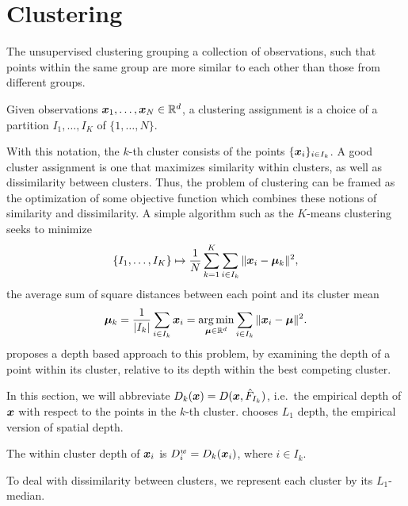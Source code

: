 \section{Clustering}
\label{sec:multivariate_clustering}

The unsupervised clustering grouping a collection of observations, such that
points within the same group are more similar to each other than those from
different groups.

\begin{definition}[Clustering]
    Given observations $\bm{x}_1, \dots, \bm{x}_N \in \mathbb{R}^d$, a clustering assignment
    is a choice of a partition $I_1, \dots, I_K$ of $\{1, \dots, N\}$.
\end{definition}

With this notation, the $k$-th cluster consists of the points $\{\bm{x}_i\}_{i
\in I_k}$.
A good cluster assignment is one that maximizes similarity within clusters, as
well as dissimilarity between clusters.
Thus, the problem of clustering can be framed as the optimization of some
objective function which combines these notions of similarity and
dissimilarity.
A simple algorithm such as the $K$-means clustering seeks to minimize
\begin{equation}
    \{I_1, \dots, I_K\} \mapsto \frac{1}{N} \sum_{k = 1}^K \sum_{i \in I_k} \Vert \bm{x}_i - \bm{\mu}_k \Vert^2,
\end{equation}
the average sum of square distances between each point and its cluster mean
\begin{equation}
    \bm{\mu}_k = \frac{1}{|I_k|} \sum_{i \in I_k} \bm{x}_i
    = \operatorname*{arg\,min}_{\bm{\mu} \in \mathbb{R}^d} \sum_{i \in I_k} \Vert \bm{x}_i - \bm{\mu} \Vert^2.
\end{equation}
\textcite{jornsten-2004} proposes a depth based approach to this problem, by
examining the depth of a point within its cluster, relative to its depth
within the best competing cluster.

In this section, we will abbreviate $D_k(\bm{x}) = D(\bm{x}, \hat{F}_{I_k})$, i.e.\
the empirical depth of $\bm{x}$ with respect to the points in the $k$-th cluster.
\textcite{jornsten-2004} chooses $L_1$ depth, the empirical version of spatial
depth.

\begin{definition}
    The within cluster depth of $\bm{x}_i$ is $D_i^w = D_k(\bm{x}_i)$, where $i \in
    I_k$.
\end{definition}

To deal with dissimilarity between clusters, we represent each cluster by its
$L_1$-median.

